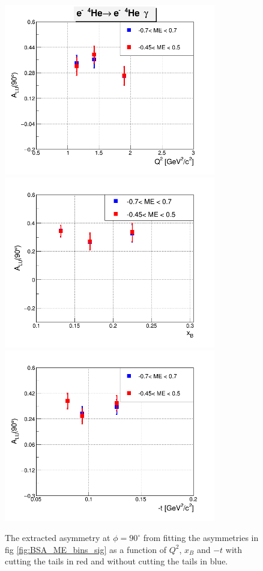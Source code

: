 \begin{enumerate}
\begin{enumerate}
    \begin{figure}[tbp]
     \centering
       \includegraphics[height=7.5cm]{fig_new/A_LU_He_90_vs_Q2.png}
       \includegraphics[height=7.5cm]{fig_new/A_LU_He_90_vs_xB.png}
       \includegraphics[height=7.5cm]{fig_new/A_LU_He_90_vs_t.png}
       \caption{The extracted asymmetry at $\phi = 90 ^{\circ}$ from
          fitting the asymmetries in fig \ref{fig:BSA_ME_bins_sig} as a 
       function of $Q^{2}$, $x_{B}$ and $-t$ with cutting the tails in red and 
    without cutting the tails in blue.  }
   \label{fig:ALU_ME_bins_sig}
    \end{figure}





\end{enumerate}
\end{enumerate}
